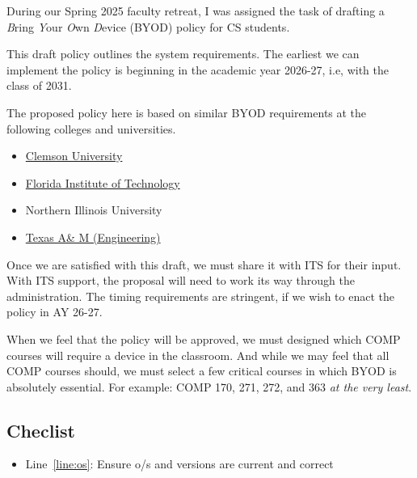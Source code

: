 \noindent 
During our Spring 2025 faculty retreat, I was assigned the task of drafting a \emph{B}ring \emph{Y}our \emph{O}wn \emph{D}evice (BYOD) policy for CS students. 

This draft policy outlines the system requirements. The earliest we can implement the policy is beginning in the academic year 2026-27, i.e, with the class of 2031.

The proposed policy here is based on similar BYOD requirements at the following colleges and universities.

\begin{itemize}
    \item \href{https://clemsonpub.cfmnetwork.com/B.aspx?BookId=11654&PageId=458060}{Clemson University}
    
    \item \href{https://www.fit.edu/policies/information-technology/policies/it-1015-bring-your-own-device-byod-policy/}{Florida Institute of Technology}
    
    \item Northern Illinois University

    \item \href{https://engineering.tamu.edu/academics/byod/index.html}{Texas A\& M (Engineering)}
\end{itemize}

Once we are satisfied with this draft, we must share it with ITS for their input. With ITS support, the proposal will need to work its way through the administration. The timing requirements are stringent, if we wish to enact the policy in AY 26-27.

When we feel that the policy will be approved, we must designed which COMP courses will require a device in the classroom. And while we may feel that all COMP courses should, we must select a few critical courses in which BYOD is absolutely essential. For example: COMP 170, 271, 272, and 363 \emph{at the very least}.

\subsection*{Checlist}
\begin{itemize}
    \item Line~\ref{line:os}: Ensure o/s and versions are current and correct
\end{itemize}


\newpage